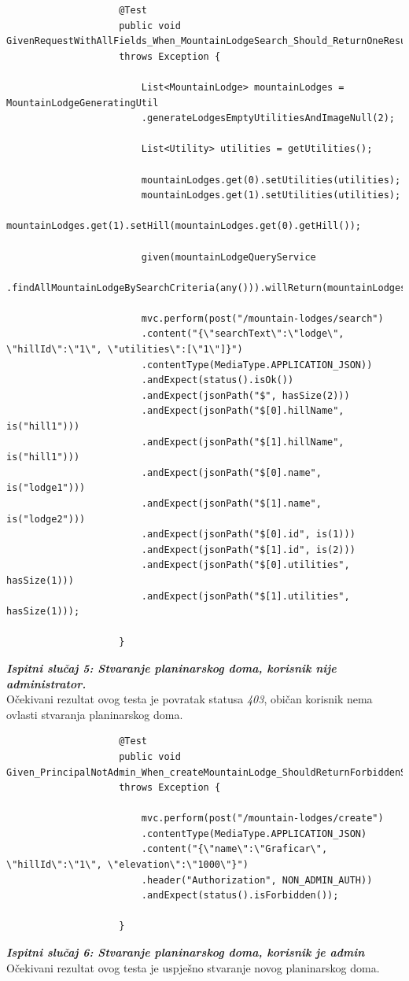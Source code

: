 				
				\begin{lstlisting}
					@Test
					public void GivenRequestWithAllFields_When_MountainLodgeSearch_Should_ReturnOneResultsGoodParams()
					throws Exception {
						
						List<MountainLodge> mountainLodges = MountainLodgeGeneratingUtil
						.generateLodgesEmptyUtilitiesAndImageNull(2);
						
						List<Utility> utilities = getUtilities();
						
						mountainLodges.get(0).setUtilities(utilities);
						mountainLodges.get(1).setUtilities(utilities);
						mountainLodges.get(1).setHill(mountainLodges.get(0).getHill());
						
						given(mountainLodgeQueryService
						.findAllMountainLodgeBySearchCriteria(any())).willReturn(mountainLodges);
						
						mvc.perform(post("/mountain-lodges/search")
						.content("{\"searchText\":\"lodge\", \"hillId\":\"1\", \"utilities\":[\"1\"]}")
						.contentType(MediaType.APPLICATION_JSON))
						.andExpect(status().isOk())
						.andExpect(jsonPath("$", hasSize(2)))
						.andExpect(jsonPath("$[0].hillName", is("hill1")))
						.andExpect(jsonPath("$[1].hillName", is("hill1")))
						.andExpect(jsonPath("$[0].name", is("lodge1")))
						.andExpect(jsonPath("$[1].name", is("lodge2")))
						.andExpect(jsonPath("$[0].id", is(1)))
						.andExpect(jsonPath("$[1].id", is(2)))
						.andExpect(jsonPath("$[0].utilities", hasSize(1)))
						.andExpect(jsonPath("$[1].utilities", hasSize(1)));
						
					}
				\end{lstlisting}		
				\textbf{\textit{Ispitni slučaj 5: Stvaranje planinarskog doma, korisnik nije administrator.}}\\
				Očekivani rezultat ovog testa je povratak statusa \textit{403}, običan korisnik nema ovlasti stvaranja planinarskog doma.\\
				
				
				\begin{lstlisting}
					@Test
					public void Given_PrincipalNotAdmin_When_createMountainLodge_ShouldReturnForbiddenStatus()
					throws Exception {
						
						mvc.perform(post("/mountain-lodges/create")
						.contentType(MediaType.APPLICATION_JSON)
						.content("{\"name\":\"Graficar\", \"hillId\":\"1\", \"elevation\":\"1000\"}")
						.header("Authorization", NON_ADMIN_AUTH))
						.andExpect(status().isForbidden());
						
					}
				\end{lstlisting}
				\textbf{\textit{Ispitni slučaj 6: Stvaranje planinarskog doma, korisnik je admin}}\\
				Očekivani rezultat ovog testa je uspješno stvaranje novog planinarskog doma.\\
				
